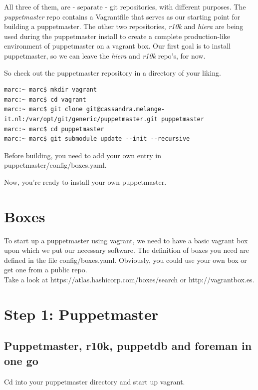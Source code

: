 \documentclass{article}
\begin{document}
\par All three of them, are - separate - git repositories, with different purposes. The \emph{puppetmaster} repo contains a Vagrantfile that serves as our starting point for building a puppetmaster. The other two repositories, \emph{r10k} and \emph{hiera} are being used during the puppetmaster install to create a complete production-like environment of puppetmaster on a vagrant box. Our first goal is to install puppetmaster, so we can leave the \emph{hiera} and \emph{r10k} repo's, for now.

\par So check out the puppetmaster repository in a directory of your liking.

\begin{verbatim}
marc:~ marc$ mkdir vagrant
marc:~ marc$ cd vagrant
marc:~ marc$ git clone git@cassandra.melange-it.nl:/var/opt/git/generic/puppetmaster.git puppetmaster
marc:~ marc$ cd puppetmaster
marc:~ marc$ git submodule update --init --recursive
\end{verbatim}

\par Before building, you need to add your own entry in puppetmaster/config/boxes.yaml.

\par Now, you're ready to install your own puppetmaster.

\section{Boxes}

To start up a puppetmaster using vagrant, we need to have a basic vagrant box upon which we put our necessary software. The definition of boxes you need are defined in the file config/boxes.yaml.
Obviously, you could use your own box or get one from a public repo.\\
Take a look at https://atlas.hashicorp.com/boxes/search or http://vagrantbox.es.

\section{Step 1: Puppetmaster}

\subsection{Puppetmaster, r10k, puppetdb and foreman in one go}
Cd into your puppetmaster directory and start up vagrant.
\end{document}

